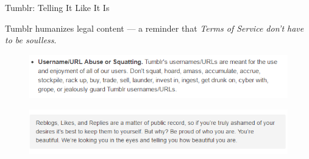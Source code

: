 \begin{frame}{Tumblr: Telling It Like It Is}

Tumblr humanizes legal content — a reminder that \textit{Terms of Service don’t have to be soulless}\cite{TUMBLR}.
     \begin{figure}
        \centering
        \includegraphics[width=\textwidth]{images/username.png}
        \label{fig:username}
    \end{figure}     
     \begin{figure}
        \centering
        \includegraphics[width=\textwidth]{images/affirmation.png}
        \label{fig:affirmation}
    \end{figure}     
\end{frame}